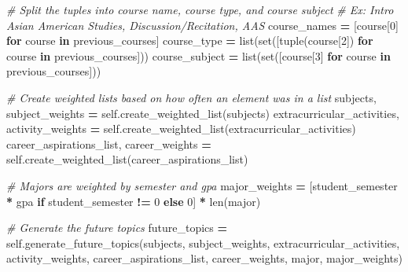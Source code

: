 \documentclass[
  twocolumn]{article}
\newenvironment{Shaded}{\begin{snugshade}}{\end{snugshade}}
\newcommand{\BuiltInTok}[1]{#1}
\newcommand{\CommentTok}[1]{\textcolor[rgb]{0.56,0.35,0.01}{\textit{#1}}}
\newcommand{\ControlFlowTok}[1]{\textcolor[rgb]{0.13,0.29,0.53}{\textbf{#1}}}
\newcommand{\DecValTok}[1]{\textcolor[rgb]{0.00,0.00,0.81}{#1}}
\newcommand{\KeywordTok}[1]{\textcolor[rgb]{0.13,0.29,0.53}{\textbf{#1}}}
\newcommand{\NormalTok}[1]{#1}
\newcommand{\OperatorTok}[1]{\textcolor[rgb]{0.81,0.36,0.00}{\textbf{#1}}}
\newcommand{\VariableTok}[1]{\textcolor[rgb]{0.00,0.00,0.00}{#1}}
\begin{document}
\begin{Shaded}
\begin{Highlighting}[]
            \CommentTok{\# Split the tuples into course name, course type, and course subject}
            \CommentTok{\# Ex: Intro Asian American Studies, Discussion/Recitation, AAS}
\NormalTok{            course\_names }\OperatorTok{=}\NormalTok{ [course[}\DecValTok{0}\NormalTok{] }\ControlFlowTok{for}\NormalTok{ course }\KeywordTok{in}\NormalTok{ previous\_courses]}
\NormalTok{            course\_type }\OperatorTok{=} \BuiltInTok{list}\NormalTok{(}\BuiltInTok{set}\NormalTok{([}\BuiltInTok{tuple}\NormalTok{(course[}\DecValTok{2}\NormalTok{]) }\ControlFlowTok{for}\NormalTok{ course }\KeywordTok{in}\NormalTok{ previous\_courses]))}
\NormalTok{            course\_subject }\OperatorTok{=} \BuiltInTok{list}\NormalTok{(}\BuiltInTok{set}\NormalTok{([course[}\DecValTok{3}\NormalTok{] }\ControlFlowTok{for}\NormalTok{ course }\KeywordTok{in}\NormalTok{ previous\_courses]))}

            \CommentTok{\# Create weighted lists based on how often an element was in a list}
\NormalTok{            subjects, subject\_weights }\OperatorTok{=} \VariableTok{self}\NormalTok{.create\_weighted\_list(subjects)}
\NormalTok{            extracurricular\_activities, activity\_weights }\OperatorTok{=} \VariableTok{self}\NormalTok{.create\_weighted\_list(extracurricular\_activities)}
\NormalTok{            career\_aspirations\_list, career\_weights }\OperatorTok{=} \VariableTok{self}\NormalTok{.create\_weighted\_list(career\_aspirations\_list)}

            \CommentTok{\# Majors are weighted by semester and gpa}
\NormalTok{            major\_weights }\OperatorTok{=}\NormalTok{ [student\_semester }\OperatorTok{*}\NormalTok{ gpa }\ControlFlowTok{if}\NormalTok{ student\_semester }\OperatorTok{!=} \DecValTok{0} \ControlFlowTok{else} \DecValTok{0}\NormalTok{] }\OperatorTok{*} \BuiltInTok{len}\NormalTok{(major)}

            \CommentTok{\# Generate the future topics}
\NormalTok{            future\_topics }\OperatorTok{=} \VariableTok{self}\NormalTok{.generate\_future\_topics(subjects, subject\_weights, extracurricular\_activities, activity\_weights, career\_aspirations\_list, career\_weights, major, major\_weights)}


\end{Highlighting}
\end{Shaded}
\end{document}
